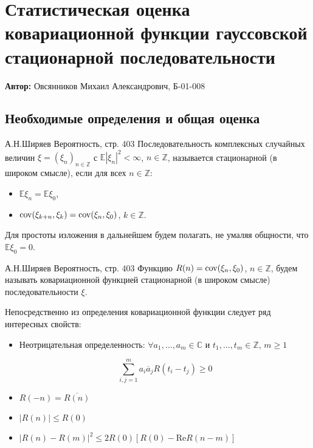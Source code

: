 	
	\section{Статистическая оценка ковариационной функции гауссовской стационарной последовательности}
	
	\textbf{Автор:} Овсянников Михаил Александрович, Б-01-008
		
		\subsection{Необходимые определения и общая оценка}
		\begin{Definition}{А.Н.Ширяев Вероятность, стр. 403}
			Последовательность комплексных случайных величин $\xi = (\xi_n)_{n \in \mathbb{Z}}$ с $\mathbb{E}|\xi_n|^2 < \infty$, $n \in \mathbb{Z}$, называется стационарной (в широком смысле), если для всех $n \in \mathbb{Z}$:
			\begin{itemize}
				\item $\mathbb{E}\xi_n = \mathbb{E}\xi_0$,
				\item $\operatorname{cov} (\xi_{k + n}, \xi_k) = \operatorname{cov}(\xi_n, \xi_0)$, $k \in \mathbb{Z}$.
			\end{itemize}
		\end{Definition}
		
		Для простоты изложения в дальнейшем будем полагать, не умаляя общности, что $\mathbb{E}\xi_0 = 0$.
		
		\begin{Definition}{А.Н.Ширяев Вероятность, стр. 403}
			Функцию $R(n) = \operatorname{cov}(\xi_n, \xi_0)$, $n \in \mathbb{Z}$, будем называть ковариационной функцией стационарной (в широком смысле) последовательности $\xi$.
		\end{Definition}
	
		Непосредственно из определения ковариационной функции следует ряд интересных свойств:
		\begin{itemize}
			\item Неотрицательная определенность: $\forall a_1, \ldots, a_m \in \mathbb{C}$ и $t_1, \ldots, t_m \in \mathbb{Z}$, $m \geqslant 1$
			
			\begin{equation*}
				\sum\limits_{i, j = 1}^m a_i \overline{a}_j R(t_i - t_j) \geqslant 0
			\end{equation*}
		
			\item $R(-n) = \overline{R(n)}$
			
			\item $|R(n)| \leqslant R(0)$
			
			\item $|R(n) - R(m)|^2 \leqslant 2 R(0) \left[R(0) - \text{Re}R(n - m)\right]$
		\end{itemize}
	
